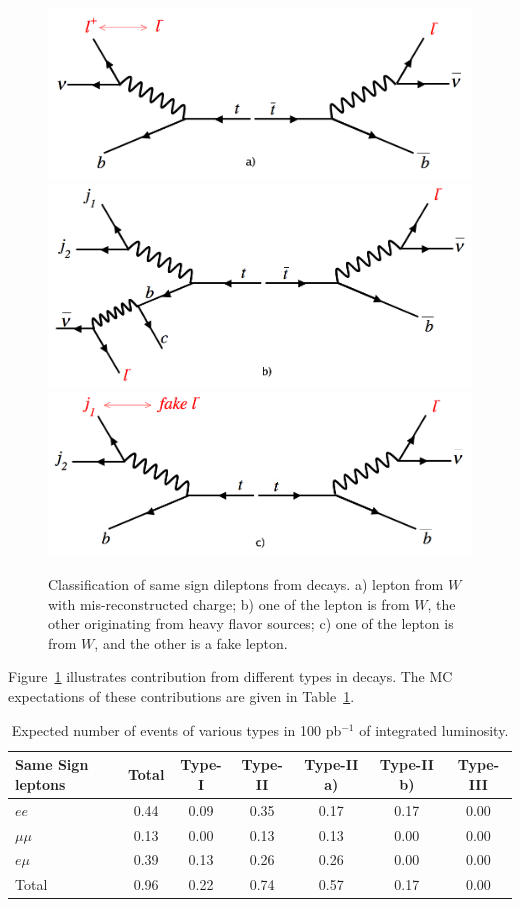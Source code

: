 \begin{figure}[htb]
\begin{center}
\includegraphics[width=0.32\linewidth, height=0.2\linewidth]{figs/feyntypeI.png}
\includegraphics[width=0.32\linewidth, height=0.2\linewidth]{figs/feyntypeIIa.png}
\includegraphics[width=0.32\linewidth, height=0.2\linewidth]{figs/feyntypeIIb.png}
\caption{ Classification of same sign dileptons from \ttbar decays. a) lepton from $W$ with mis-reconstructed charge; 
b) one of the lepton is from $W$, the other originating from heavy flavor sources; c) one of the lepton is from $W$,
and the other is a fake lepton. \label{fig:fakeOrigin}}
\end{center}
\end{figure}

Figure~\ref{fig:fakeOrigin} illustrates contribution from different types in \ttbar decays. The MC 
expectations of these contributions are given in Table~\ref{tab:fakeOrigin}.

\begin{table}[hbt]
\begin{center}
\begin{tabular}{|l|c|c|c|c|c|c|}\hline
Same Sign leptons & Total & 	 Type-I &  Type-II & Type-II a) & Type-II b) & Type-III \\ \hline
$ee$ &	0.44 &	0.09 &	0.35 &	0.17 &	0.17 &	0.00 \\
$\mu \mu$ & 	0.13 &	0.00 &	0.13 &	0.13 &	0.00 &	0.00 \\
$e\mu$ &	0.39 &	0.13 &	0.26 &	0.26 &	0.00 &	0.00 \\
Total &	0.96 &	0.22 &	0.74 &	0.57 &	0.17 &	0.00 \\
\hline
\end{tabular}
\caption{ Expected number of \ttbar events of various types in 100 pb$^{-1}$ of integrated luminosity.\label{tab:fakeOrigin}}
\end{center}
\end{table}

